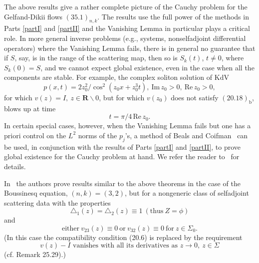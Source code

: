 \documentclass{surv-l}
\theoremstyle{plain}
\theoremstyle{definition}
\numberwithin{equation}{chapter}
\begin{document}
The above results give a rather complete picture of the Cauchy problem for the Gelfand-Dikii flows $(35.1)_{n,k}$. The results use the full power of the methods in Parts \ref{partI} and \ref{partII} and the Vanishing Lemma in particular plays a critical role. In more general inverse problems (e.g., systems, nonselfadjoint differential operators) where the Vanishing Lemma fails, there is in general no guarantee that if $S$, say, is in the range of the scattering map, then so is $S_{k}(t)$, $t\neq 0$, where $S_{k}(0)=S$, and we cannot expect global existence, even in the case when all the components are stable. For example, the complex soliton solution of KdV
\begin{equation*}
p(x, t)=2z_{0}^{2}/\cos^{2}(z_{0}x+z_{0}^{3}t),\ \mathrm{Im}\,z_{0}>0,\ \mathrm{Re}\, z_{0}>0,
\end{equation*}
for which $v(z)=I,\ z\in \mathbf{R}\backslash 0$, but for which $v(z_{0})$ does not satisfy $(20.18)_{\mathrm{b}}$, blows up at time
\begin{equation*}
t=\pi/4\,\mathrm{Re}\, z_{0}.
\end{equation*}
In certain special cases, however, when the Vanishing Lemma fails but one has a priori control on the $L^{2}$ norms of the $p_{j}$'s, a method of Beals and Coifman~\cite{BC2} can be used, in conjunction with the results of Parts \ref{partI} and \ref{partII}, to prove global existence for the Cauchy problem at hand. We refer the reader to~\cite{BC2} for details.

In~\cite{DTT} the authors prove results similar to the above theorems in the case of the Boussinesq equation, $(n, k)=(3, 2)$, but for a nongeneric class of selfadjoint scattering data with the properties
\setcounter{equation}{39}
\begin{equation}\label{eq35.40}
\triangle_{1}(z)=\triangle_{2}(z)\equiv 1\ (\mathrm{thus}\  Z=\phi)
\end{equation}
and
\begin{equation}\label{eq35.41}
\mathrm{either}\ v_{23}(z)\equiv 0\ \mathrm{or}\ v_{32}(z)\equiv 0\ \mathrm{for}\ z\in\Sigma_{0}.
\end{equation}
(In this case the compatibility condition (20.6) is replaced by the requirement
\begin{equation}\label{eq35.42}
v(z)-I \text{ vanishes with all its derivatives as } z\rightarrow 0,\  z\in\Sigma
\end{equation}
(cf. Remark 25.29).)
\end{document}
